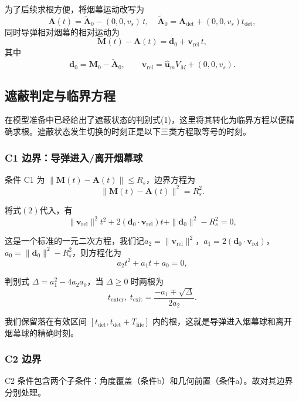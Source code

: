 \documentclass{ctexart}
\begin{document}
为了后续求根方便，将烟幕运动改写为
\[
\mathbf{A}(t) = \tilde{\mathbf{A}}_0 - (0,0,v_s)\,t,\quad \tilde{\mathbf{A}}_0 = \mathbf{A}_{\text{det}} + (0,0,v_s)t_{\text{det}},
\]
同时导弹相对烟幕的相对运动为
\begin{equation}
\mathbf{M}(t)-\mathbf{A}(t)=\mathbf{d}_0 + \mathbf{v}_{\text{rel}}\,t,
\label{eq:rel-mot}
\end{equation}
其中
\[
\mathbf{d}_0 = \mathbf{M}_0 - \tilde{\mathbf{A}}_0,\qquad
\mathbf{v}_{\text{rel}} = \hat{\mathbf{u}}_m V_M + (0,0,v_s).
\]

\subsection{遮蔽判定与临界方程}
在模型准备中已经给出了遮蔽状态的判别式(1)，这里将其转化为临界方程以便精确求根。遮蔽状态发生切换的时刻正是以下三类方程取等号的时刻。

\subsubsection{C1 边界：导弹进入/离开烟幕球}
条件 C1 为 $\|\mathbf{M}(t)-\mathbf{A}(t)\| \le R_s$，边界方程为
\[
\|\mathbf{M}(t)-\mathbf{A}(t)\|^2 = R_s^2.
\]

将式$(2)$代入，有
\[
\|\mathbf{v}_{\text{rel}}\|^2 t^2 + 2(\mathbf{d}_0\cdot\mathbf{v}_{\text{rel}}) t +  \|\mathbf{d}_0\|^2 - R_s^2 = 0,
\]

这是一个标准的一元二次方程，我们记$a_2 = \|\mathbf{v}_{\text{rel}}\|^2$，$a_1 = 2(\mathbf{d}_0\cdot\mathbf{v}_{\text{rel}})$，$a_0 = \|\mathbf{d}_0\|^2 - R_s^2$，则方程化为
\[
a_2 t^2 + a_1 t + a_0 = 0,
\]

判别式 $\Delta = a_1^2 - 4a_2a_0$，当 $\Delta\ge 0$ 时两根为
\[
t_{\text{enter}},\;t_{\text{exit}} = \frac{-a_1 \mp \sqrt{\Delta}}{2a_2}.
\]

我们保留落在有效区间 $[t_{\text{det}}, t_{\text{det}}+T_{\text{life}}]$ 内的根，这就是导弹进入烟幕球和离开烟幕球的精确时刻。

\subsubsection{C2 边界}
C2 条件包含两个子条件：角度覆盖（条件b）和几何前置（条件a）。故对其边界分别处理。
\end{document}
